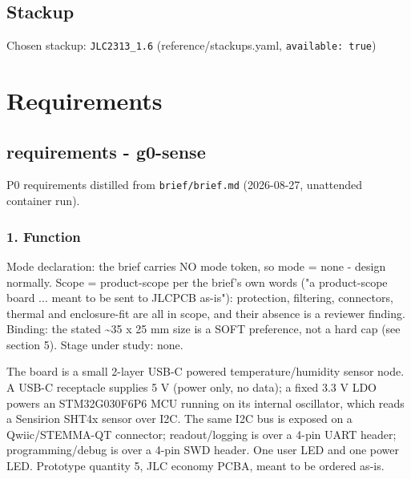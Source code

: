 \documentclass[11pt,a4paper]{article}
\begin{document}
\subsection*{Stackup}
Chosen stackup: \texttt{JLC2313\_1.6} (reference/stackups.yaml, \texttt{available: true})
\section{Requirements}
\subsection*{requirements - g0-sense}
P0 requirements distilled from \texttt{brief/brief.md} (2026-08-27, unattended container run).

\subsubsection*{1. Function}
Mode declaration: the brief carries NO mode token, so mode = none - design normally. Scope = product-scope per the brief's own words ("a product-scope board ... meant to be sent to JLCPCB as-is"): protection, filtering, connectors, thermal and enclosure-fit are all in scope, and their absence is a reviewer finding. Binding: the stated \textasciitilde{}35 x 25 mm size is a SOFT preference, not a hard cap (see section 5). Stage under study: none.

The board is a small 2-layer USB-C powered temperature/humidity sensor node. A USB-C receptacle supplies 5 V (power only, no data); a fixed 3.3 V LDO powers an STM32G030F6P6 MCU running on its internal oscillator, which reads a Sensirion SHT4x sensor over I2C. The same I2C bus is exposed on a Qwiic/STEMMA-QT connector; readout/logging is over a 4-pin UART header; programming/debug is over a 4-pin SWD header. One user LED and one power LED. Prototype quantity 5, JLC economy PCBA, meant to be ordered as-is.
\end{document}
